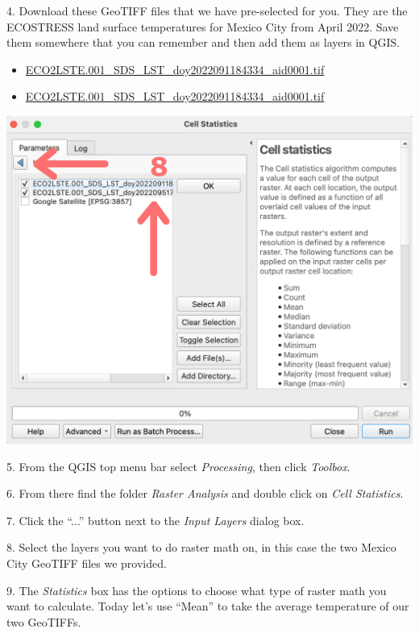 \documentclass[oneside,a4paper,11pt,explicit]{book}
\begin{document}
\vspace{.5em}

4. Download these GeoTIFF files that we have pre-selected for you. They are the ECOSTRESS land surface temperatures for Mexico City from April 2022. Save them somewhere that you can remember and then add them as layers in QGIS. 

\begin{itemize}
    \item \href{https://jeremydforsythe.github.io/icecream-tutorials/Tutorial10_RasterCalculator/ECO2LSTE.001_SDS_LST_doy2022091184334_aid0001.tif}{\small ECO2LSTE.001\_SDS\_LST\_doy2022091184334\_aid0001.tif}
    \item \href{https://jeremydforsythe.github.io/icecream-tutorials/Tutorial10_RasterCalculator/ECO2LSTE.001_SDS_LST_doy2022091184334_aid0001.tif}{\small ECO2LSTE.001\_SDS\_LST\_doy2022091184334\_aid0001.tif}
\end{itemize}

\vspace{.5em}

\centerline{\includegraphics[width=.6\textwidth]{CellSelect.png}}

\vspace{.5em}

5. From the QGIS top menu bar select \textit{Processing}, then click \textit{Toolbox}.

6. From there find the folder \textit{Raster Analysis} and double click on \textit{Cell Statistics}.

7. Click the ``...'' button next to the \textit{Input Layers} dialog box. 

8. Select the layers you want to do raster math on, in this case the two Mexico City GeoTIFF files we provided.

9. The \textit{Statistics} box has the options to choose what type of raster math you want to calculate. Today let's use ``Mean'' to take the average temperature of our two GeoTIFFs. 
\end{document}
